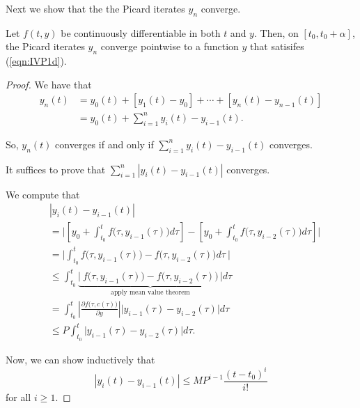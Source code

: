 \documentclass{article}
\begin{document}
Next we show that the the Picard iterates $y_n$ converge.

\begin{theorem}
    \label{thm:IVP1dExistence}
    Let $f(t,y)$ be continuously differentiable in both $t$ and $y$.
    Then, on $[t_0, t_0 + \alpha]$, the Picard iterates $y_n$ converge pointwise to a function $y$ that satisifes (\ref{eqn:IVP1d}).
\end{theorem}

\begin{proof}

We have that
\begin{align*}
    y_n(t)
    &=
    y_0(t) + [y_1(t)-y_0] + \cdots + [y_n(t)-y_{n-1}(t)] \\
    &=
    y_0(t)
    +
    \sum_{i=1}^n
    y_i(t)-y_{i-1}(t).
\end{align*}

So, $y_n(t)$ converges if and only if $\sum_{i=1}^n y_i(t)-y_{i-1}(t)$ converges.

It suffices to prove that $\sum_{i=1}^n |y_i(t) - y_{i-1}(t)|$ converges.

We compute that
\begin{align*}
    &|y_i(t) - y_{i-1}(t)| \\
    &=
    \Bigg|
        \left[
            y_0 
            + \int_{t_0}^t
            f\big(\tau,y_{i-1}(\tau)\big)
            d\tau
        \right]
        -
        \left[
            y_0
            + \int_{t_0}^t
            f\big(\tau,y_{i-2}(\tau)\big)
            d\tau
        \right]
    \Bigg| \\
    &=
    \Bigg\lvert
    \int_{t_0}^t
    f\big(\tau,y_{i-1}(\tau)\big)
    - f\big(\tau,y_{i-2}(\tau)\big)
    d\tau\:
    \Bigg\rvert \\
    &\leq
    \int_{t_0}^t
    \underbrace{
        \big\lvert\:
            f\big(\tau,y_{i-1}(\tau)\big)
            - f\big(\tau,y_{i-2}(\tau)\big)
        \,\big\rvert
    }_{\text{apply mean value theorem}}
    d\tau \\
    &=
    \int_{t_0}^t
    \left\lvert
        \frac{\partial f\big(\tau, c(\tau)\big)}
        {\partial y}
    \right\rvert
    \big\lvert
        y_{i-1}(\tau) - y_{i-2}(\tau)
    \big\rvert
    d\tau \\
    &\leq
    P
    \int_{t_0}^t
    \big\lvert
        y_{i-1}(\tau) - y_{i-2}(\tau)
    \big\rvert
    d\tau.
\end{align*}

Now, we can show inductively that 
\begin{equation}
    \label{eqn:PicardIterErrorBound}
    |y_i(t)-y_{i-1}(t)|
    \leq
    MP^{i-1}\frac{(t-t_0)^i}{i!}
\end{equation}
for all $i \geq 1$.


\end{proof}
\end{document}
